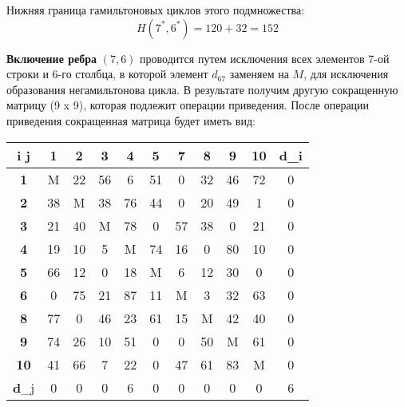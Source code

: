 \documentclass[17pt]{extarticle}
\begin{document}
Нижняя граница гамильтоновых циклов этого подмножества:
\[ H(7^*,6^*) = 120 + 32 = 152 \]

\textbf{Включение ребра} \( (7,6) \) проводится путем исключения всех элементов 7-ой строки и 6-го столбца, в которой элемент \( d_{67} \) заменяем на \( M \), для исключения образования негамильтонова цикла.
В результате получим другую сокращенную матрицу (9 x 9), которая подлежит операции приведения.
После операции приведения сокращенная матрица будет иметь вид:

\begin{table}[H]
    \centering
    \begin{tabular}{|c|c|c|c|c|c|c|c|c|c|c|}
        \hline
        \textbf{i j} & \textbf{1} & \textbf{2} & \textbf{3} & \textbf{4} & \textbf{5} & \textbf{7} & \textbf{8} & \textbf{9} & \textbf{10} & \textbf{d}_i \\ \hline
        \textbf{1}   & M          & 22         & 56         & 6          & 51         & 0          & 32         & 46         & 72          & 0            \\ \hline
        \textbf{2}   & 38         & M          & 38         & 76         & 44         & 0          & 20         & 49         & 1           & 0            \\ \hline
        \textbf{3}   & 21         & 40         & M          & 78         & 0          & 57         & 38         & 0          & 21          & 0            \\ \hline
        \textbf{4}   & 19         & 10         & 5          & M          & 74         & 16         & 0          & 80         & 10          & 0            \\ \hline
        \textbf{5}   & 66         & 12         & 0          & 18         & M          & 6          & 12         & 30         & 0           & 0            \\ \hline
        \textbf{6}   & 0          & 75         & 21         & 87         & 11         & M          & 3          & 32         & 63          & 0            \\ \hline
        \textbf{8}   & 77         & 0          & 46         & 23         & 61         & 15         & M          & 42         & 40          & 0            \\ \hline
        \textbf{9}   & 74         & 26         & 10         & 51         & 0          & 0          & 50         & M          & 61          & 0            \\ \hline
        \textbf{10}  & 41         & 66         & 7          & 22         & 0          & 47         & 61         & 83         & M           & 0            \\ \hline
        \textbf{d}_j & 0          & 0          & 0          & 6          & 0          & 0          & 0          & 0          & 0           & 6            \\ \hline
    \end{tabular}
\end{table}
\end{document}
